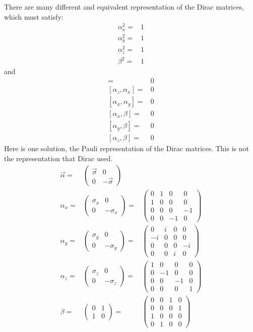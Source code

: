 \documentclass[]{article}
\begin{document}
There are many different and equivalent representation of the Dirac matrices, which must satisfy:
\begin{align*}
	\alpha_x^2=&1  \\
	\alpha_y^2=&1  \\
	\alpha_z^2=&1  \\
	\beta^2=&1
\end{align*}
and
\begin{align*}
	[\alpha_y,\alpha_z] =&0 \\
	[\alpha_z,\alpha_x] =&0 \\
	[\alpha_x,\alpha_y ]=&0 \\
	[\alpha_x,\beta]=&0 \\
	[\alpha_y,\beta]=&0 \\
	[\alpha_z,\beta]=&0 
\end{align*}
Here is one solution, the Pauli representation of the Dirac matrices. This is not the representation that Dirac used.
\begin{align*}
	\vec{\alpha} =& \begin{pmatrix}
		\vec{\sigma}&0 \\
		0&-\vec{\sigma}
	\end{pmatrix} \\ 
	\alpha_x =& \begin{pmatrix}
		\sigma_x&0\\
		0&-\sigma_x
	\end{pmatrix}=&\begin{pmatrix}
		0&1&0&0\\
		1&0&0&0\\
		0&0&0&-1\\
		0&0&-1&0
	\end{pmatrix}\\
	\alpha_y =& \begin{pmatrix}
	\sigma_y&0\\
	0&-\sigma_y
	\end{pmatrix}=&\begin{pmatrix}
		0&i&0&0\\
		-i&0&0&0\\
		0&0&0&-i\\
		0&0&i&0
	\end{pmatrix}\\
	\alpha_z =& \begin{pmatrix}
	\sigma_z&0\\
	0&-\sigma_z
	\end{pmatrix}=&\begin{pmatrix}
		1&0&0&0\\
		0&-1&0&0\\
		0&0&-1&0\\
		0&0&0&1
	\end{pmatrix}\\
	\beta =& \begin{pmatrix}
		0&1\\
		1&0
	\end{pmatrix} =&\begin{pmatrix}
		0&0&1&0\\
		0&0&0&1\\
		1&0&0&0\\
		0&1&0&0
	\end{pmatrix}
\end{align*}
\end{document}
